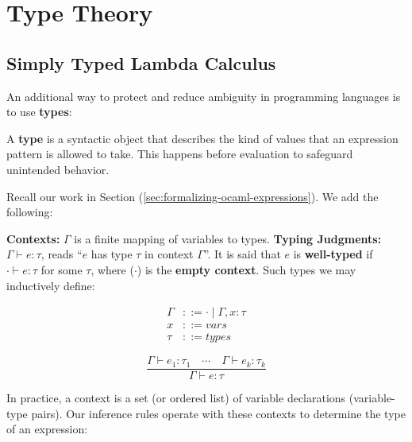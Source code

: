 \newpage 

\section{Type Theory}
\subsection{Simply Typed Lambda Calculus}

\label{sec:types}

\noindent
An additional way to protect and reduce ambiguity in programming languages is to use \textbf{types}:

\begin{Def}[A Type]

    A \textbf{type} is a syntactic object that describes 
    the kind of values that an expression pattern is allowed to take.
    This happens before evaluation to safeguard unintended behavior.
\end{Def}

\noindent
Recall our work in Section (\ref{sec:formalizing-ocaml-expressions}). We add the following:

\begin{Def}

    \textbf{Contexts:} $\Gamma$ is a finite mapping of variables to types. \textbf{Typing Judgments:} $\Gamma \vdash e : \tau$, reads ``$e$ has type $\tau$ in context $\Gamma$''. It is 
    said that $e$ is \textbf{well-typed} if $\cdot \vdash e : \tau$ for some $\tau$, where ($\cdot$) is the \textbf{empty context}.
    Such types we may inductively define:\\
    \begin{minipage}{0.45\textwidth}
        \begin{align*}
            \Gamma &::= \cdot \mid \Gamma, x : \tau \\
            x &::= vars\\
            \tau &::= types
        \end{align*}
    \end{minipage}
    \hfill
    \begin{minipage}{0.45\textwidth}
        \[
        \frac{
          \Gamma \vdash e_1 : \tau_1 \quad \cdots \quad \Gamma \vdash e_k : \tau_k
        }{
          \Gamma \vdash e : \tau
        }
        \]
    \end{minipage}

    \vspace{.5em}
    \noindent
    In practice, a context is a set (or ordered list) of variable declarations (variable-type pairs). Our 
    inference rules operate with these contexts to determine the type of an expression:
\end{Def}

